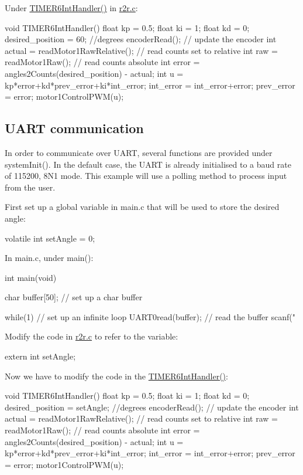 Under {\ttfamily \mbox{\hyperlink{r2r_8c_a57b21594b75d4b2a140a1f9bbb1465e8}{T\+I\+M\+E\+R6\+Int\+Handler()}}} in {\ttfamily \mbox{\hyperlink{r2r_8c}{r2r.\+c}}}\+: \begin{DoxyVerb}void TIMER6IntHandler(){
    float kp = 0.5;
    float ki = 1;
    float kd = 0;
    desired_position = 60; //degrees
    encoderRead(); // update the encoder
    int actual = readMotor1RawRelative(); // read counts set to relative
    int raw = readMotor1Raw(); // read counts absolute
    int error = angles2Counts(desired_position) - actual;
    int u = kp*error+kd*prev_error+ki*int_error;
     int_error = int_error+error;
     prev_error = error;
    motor1ControlPWM(u);
 }  
\end{DoxyVerb}
\hypertarget{index_communication}{}\subsection{U\+A\+R\+T communication}\label{index_communication}
In order to communicate over U\+A\+RT, several functions are provided under {\ttfamily system\+Init()}. In the default case, the U\+A\+RT is already initialised to a baud rate of 115200, 8\+N1 mode. This example will use a polling method to process input from the user.

First set up a global variable in {\ttfamily main.\+c} that will be used to store the desired angle\+: \begin{DoxyVerb}volatile int setAngle = 0;
\end{DoxyVerb}


In {\ttfamily main.\+c}, under {\ttfamily main()}\+: \begin{DoxyVerb}    int main(void){
    char buffer[50]; // set up a char buffer

    while(1){ // set up an infinite loop
        UART0read(buffer); // read the buffer
        scanf("%
    }   
}
\end{DoxyVerb}


Modify the code in {\ttfamily \mbox{\hyperlink{r2r_8c}{r2r.\+c}}} to refer to the variable\+: \begin{DoxyVerb}    extern int setAngle;
\end{DoxyVerb}


Now we have to modify the code in the {\ttfamily \mbox{\hyperlink{r2r_8c_a57b21594b75d4b2a140a1f9bbb1465e8}{T\+I\+M\+E\+R6\+Int\+Handler()}}}\+: \begin{DoxyVerb}void TIMER6IntHandler(){
    float kp = 0.5;
    float ki = 1;
    float kd = 0;
    desired_position = setAngle; //degrees
    encoderRead(); // update the encoder
    int actual = readMotor1RawRelative(); // read counts set to relative
    int raw = readMotor1Raw(); // read counts absolute
    int error = angles2Counts(desired_position) - actual;
    int u = kp*error+kd*prev_error+ki*int_error;
     int_error = int_error+error;
     prev_error = error;
    motor1ControlPWM(u);
 }  \end{DoxyVerb}
 